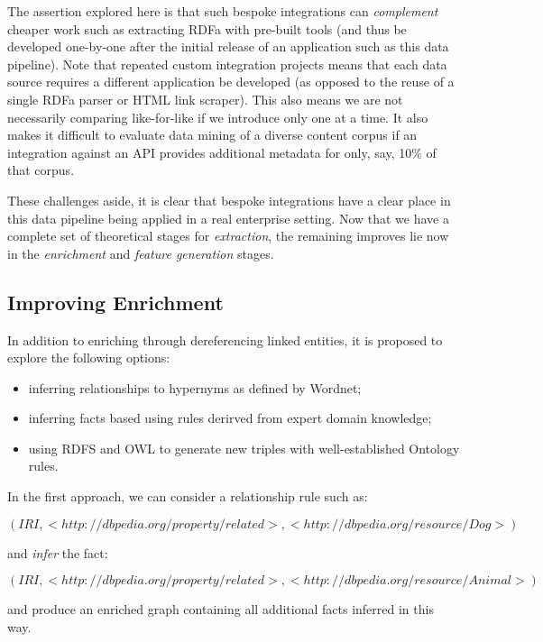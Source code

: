\documentclass[10pt,a4paper]{report}
\begin{document}
The assertion explored here is that such bespoke integrations can
\emph{complement} cheaper work such as extracting RDFa with pre-built tools
(and thus be developed one-by-one after the initial release of an application
such as this data pipeline). Note that repeated custom integration projects
means that each data source requires a different application be developed (as
opposed to the reuse of a single RDFa parser or HTML link scraper). This
also means we are not necessarily comparing like-for-like if we introduce only
one at a time. It also makes it
difficult to evaluate data mining of a diverse content corpus if an integration
against an API provides additional metadata for only, say, 10\% of that corpus.

These challenges aside, it is clear that bespoke integrations have a clear place
in this data pipeline being applied in a real enterprise setting. Now that
we have a complete set of theoretical stages for \emph{extraction}, the
remaining improves lie now in the \emph{enrichment} and
\emph{feature generation} stages.

\subsection{Improving Enrichment}

In addition to enriching through dereferencing linked entities, it is proposed
to explore the following options:

\begin{itemize}
\item inferring relationships to hypernyms as defined by Wordnet\cite{miller1995wordnet};
\item inferring facts based using rules derirved from expert domain knowledge;
\item using RDFS and OWL to generate new triples with well-established Ontology rules.
\end{itemize}

In the first approach, we can consider a relationship rule such as:

$$
(IRI, <\!\!http\!:\!\!//dbpedia.org/property/related\!\!>, <\!\!http\!:\!\!//dbpedia.org/resource/Dog\!\!>)
$$

\noindent and \emph{infer} the fact:

$$
(IRI, <\!\!http\!:\!\!//dbpedia.org/property/related\!\!>, <\!\!http\!:\!\!//dbpedia.org/resource/Animal\!\!>)
$$

\noindent and produce an enriched graph containing all additional facts
inferred in this way.
\end{document}
